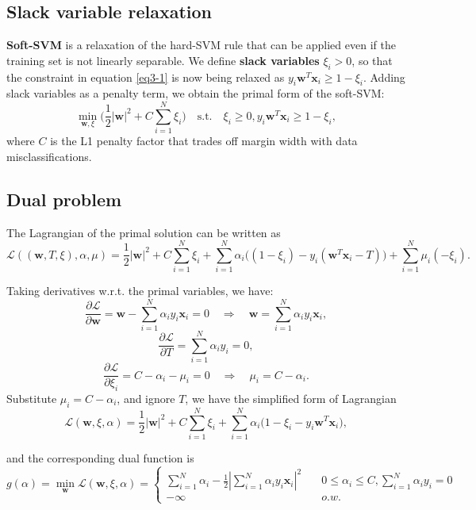 \documentclass[../main.tex]{subfiles}
\begin{document}
\setlength{\parindent}{0pt}
\subsection{Slack variable relaxation}
\textbf{Soft-SVM} is a relaxation of the hard-SVM rule that can be applied even if the training set is not linearly separable. We define \textbf{slack variables} $\xi_i>0$, so that the constraint in equation \ref{eq3-1} is now being relaxed as $y_i\textbf{w}^T\textbf{x}_i\geq 1-\xi_i$. Adding slack variables as a penalty term, we obtain the primal form of the soft-SVM: $$\min_{\textbf{w}, \xi}\big( \frac{1}{2}|\textbf{w}|^2+C\sum_{i=1}^N\xi_i \big) \quad \text{s.t.} \quad \xi_i\geq 0, y_i\textbf{w}^T\textbf{x}_i\geq 1-\xi_i,$$
where $C$ is the L1 penalty factor that trades off margin width with data misclassifications.

\subsection{Dual problem}
The Lagrangian of the primal solution can be written as $$\mathcal{L}((\textbf{w}, T, \xi), \alpha, \mu)=\frac{1}{2}|\textbf{w}|^2+C\sum_{i=1}^N\xi_i+\sum_{i=1}^N\alpha_i\big((1-\xi_i)-y_i(\textbf{w}^T\textbf{x}_i-T)\big)+\sum_{i=1}^N\mu_i(-\xi_i).$$

Taking derivatives w.r.t. the primal variables, we have: $$\frac{\partial \mathcal{L}}{\partial \textbf{w}}=\textbf{w}-\sum_{i=1}^N\alpha_iy_i\textbf{x}_i=0 \quad \Rightarrow \quad \textbf{w}=\sum_{i=1}^N\alpha_iy_i\textbf{x}_i,$$
$$\frac{\partial \mathcal{L}}{\partial T}=\sum_{i=1}^N\alpha_iy_i=0,$$
$$\frac{\partial \mathcal{L}}{\partial \xi_i}=C-\alpha_i-\mu_i=0 \quad \Rightarrow \quad \mu_i=C-\alpha_i.$$
Substitute $\mu_i=C-\alpha_i$, and ignore $T$, we have the simplified form of Lagrangian $$\mathcal{L}(\textbf{w}, \xi, \alpha)=\frac{1}{2}|\textbf{w}|^2+C\sum_{i=1}^N\xi_i+\sum_{i=1}^N\alpha_i\big(1-\xi_i-y_i\textbf{w}^T\textbf{x}_i\big),$$

and the corresponding dual function is
\begin{equation} \label{eq3-4}
g(\alpha) = \min_{\textbf{w}} \mathcal{L}(\textbf{w}, \xi, \alpha) = \left\{
        \begin{array}{ll}
            \sum_{i=1}^N \alpha_i-\frac{1}{2}|\sum_{i=1}^N\alpha_i y_i \textbf{x}_i|^2 & \quad 0\leq \alpha_i\leq C, \sum_{i=1}^N\alpha_iy_i=0 \\
            -\infty & \quad o.w.
        \end{array}
    \right.
\end{equation}
\end{document}

